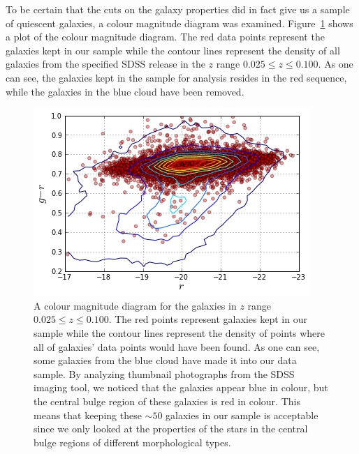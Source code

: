 \documentclass[showcase, preprintnumbers, amsmath, amssymb, bibnotes, 12pt]{revtex4}
\begin{document}
To be certain that the cuts on the galaxy properties did in fact give us a sample of quiescent galaxies, a colour magnitude diagram was examined. Figure~\ref{fig:color_mag} shows a plot of the colour magnitude diagram. The red data points represent the galaxies kept in our sample while the contour lines represent the density of all galaxies from the specified SDSS release in the $z$ range $0.025\leq z\leq0.100$. As one can see, the galaxies kept in the sample for analysis resides in the red sequence, while the galaxies in the blue cloud have been removed. 


\begin{figure}
\begin{center}
\includegraphics[scale=0.73]{color_mag.png}
\end{center}
\caption{A colour magnitude diagram for the galaxies in $z$ range $0.025\leq z\leq0.100$. The red points represent galaxies kept in our sample while the contour lines represent the density of points where all of galaxies' data points would have been found. As one can see, some galaxies from the blue cloud have made it into our data sample. By analyzing thumbnail photographs from the SDSS imaging tool, we noticed that the galaxies appear blue in colour, but the central bulge region of these galaxies is red in colour. This means that keeping these $\sim50$ galaxies in our sample is acceptable since we only looked at the properties of the stars in the central bulge regions of different morphological types.
\label{fig:color_mag}} 
\end{figure}


\end{document}

